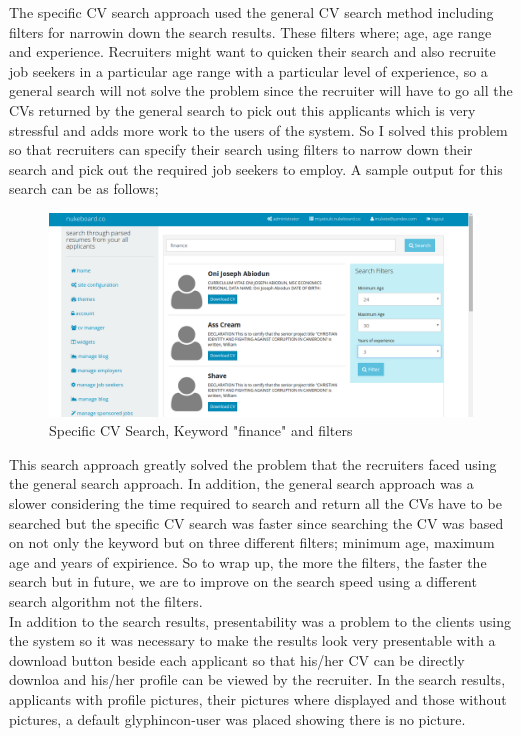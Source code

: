 The specific CV search approach used the general CV search method including filters for narrowin down the search results. These filters where; age, age range and experience. Recruiters might want to quicken their search and also recruite job seekers in a particular age range with a particular level of experience, so a general search will not solve the problem since the recruiter will have to go all the CVs returned by the general search to pick out this applicants which is very stressful and adds more work to the users of the system. So I solved this problem so that recruiters can specify their search using filters to narrow down their search and pick out the required job seekers to employ. A sample output for this search can be as follows;

\begin{figure}[h]
\centering
\includegraphics[width=13cm,scale=1.5]{Figures/SpecificCVSearch}
\decoRule
\caption[Specific CV Search Approach]{Specific CV Search, Keyword "finance" and filters}
\label{fig:SpecificCVSearch}
\end{figure} 

This search approach greatly solved the problem that the recruiters faced using the general search approach. In addition, the general search approach was a slower considering the time required to search and return all the CVs have to be searched but the specific CV search was faster since searching the CV was based on not only the keyword but on three different filters; minimum age, maximum age and years of expirience. So to wrap up, the more the filters, the faster the search but in future, we are to improve on the search speed using a different search algorithm not the filters. \\

In addition to the search results, presentability was a problem to the clients using the system so it was necessary to make the results look very presentable with a download button beside each applicant so that his/her CV can be directly downloa and his/her profile can be viewed by the recruiter. In the search results, applicants with profile pictures, their pictures where displayed and those without pictures, a default glyphincon-user was placed showing there is no picture.

